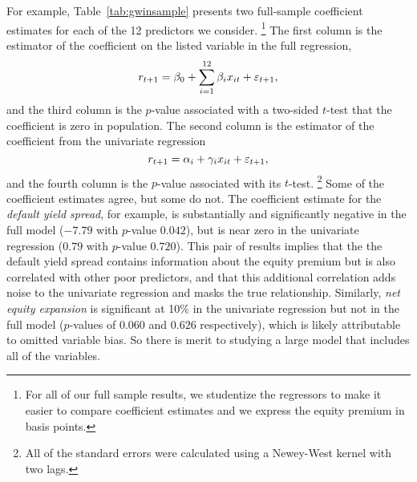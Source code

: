 \documentclass[12pt]{article}
\begin{document}
For example, Table~\ref{tab:gwinsample} presents two full-sample
coefficient estimates for each of the 12 predictors we consider.%
\footnote{For all of our full sample results, we studentize the
  regressors to make it easier to compare coefficient estimates and we
  express the equity premium in basis points.} %
The first column is the estimator of the coefficient on the listed
variable in the full regression,
\begin{equation}\label{eq:30}
  r_{t+1} = \beta_0 + \sum_{i=1}^{12} \beta_{i} x_{it} + \varepsilon_{t+1},
\end{equation}
and the third column is the $p$-value associated with a two-sided
$t$-test that the coefficient is zero in population. The second column
is the estimator of the coefficient from the univariate regression
\begin{equation}
  r_{t+1} = \alpha_i + \gamma_{i} x_{it} + \varepsilon_{t+1},
\end{equation}
and the fourth column is the $p$-value associated with its $t$-test.%
\footnote{All of the standard errors were calculated using a
  Newey-West kernel with two lags.} %
Some of the coefficient estimates agree, but some do not. The
coefficient estimate for the \emph{default yield spread}, for example,
is substantially and significantly negative in the full model ($-7.79$
with $p$-value $0.042$), but is near zero in the univariate regression
($0.79$ with $p$-value $0.720$). This pair of results implies that the
the default yield spread contains information about the equity premium
but is also correlated with other poor predictors, and that this
additional correlation adds noise to the univariate regression
and masks the true relationship. Similarly, \emph{net equity expansion}
is significant at 10\% in the univariate regression but not in the
full model ($p$-values of $0.060$ and $0.626$ respectively), which is
likely attributable to omitted variable bias. So there is merit to
studying a large model that includes all of the variables.
\end{document}
